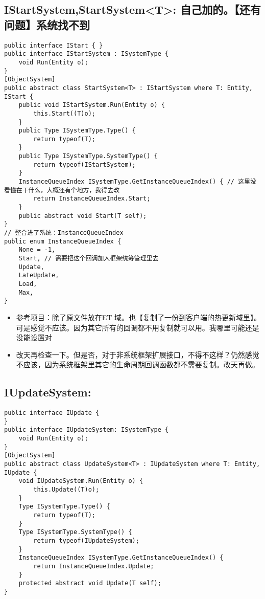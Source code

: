 \documentclass[9pt, b5paper]{article}
\begin{document}
\subsection{IStartSystem,StartSystem<T>: 自己加的。【还有问题】系统找不到}
\label{sec-2-7}
\begin{verbatim}
public interface IStart { }
public interface IStartSystem : ISystemType {
    void Run(Entity o);
}
[ObjectSystem]
public abstract class StartSystem<T> : IStartSystem where T: Entity, IStart {
    public void IStartSystem.Run(Entity o) {
        this.Start((T)o);
    }
    public Type ISystemType.Type() {
        return typeof(T);
    }
    public Type ISystemType.SystemType() {
        return typeof(IStartSystem);
    }
    InstanceQueueIndex ISystemType.GetInstanceQueueIndex() { // 这里没看懂在干什么，大概还有个地方，我得去改
        return InstanceQueueIndex.Start; 
    }
    public abstract void Start(T self);
}
// 整合进了系统：InstanceQueueIndex
public enum InstanceQueueIndex {
    None = -1,
    Start, // 需要把这个回调加入框架统筹管理里去 
    Update,
    LateUpdate,
    Load,
    Max,
}
\end{verbatim}
\begin{itemize}
\item 参考项目：除了原文件放在ET 域。也【复制了一份到客户端的热更新域里】。可是感觉不应该。因为其它所有的回调都不用复制就可以用。我哪里可能还是没能设置对
\item 改天再检查一下。但是否，对于非系统框架扩展接口，不得不这样？仍然感觉不应该，因为系统框架里其它的生命周期回调函数都不需要复制。改天再做。
\end{itemize}
\subsection{IUpdateSystem:}
\label{sec-2-8}
\begin{verbatim}
public interface IUpdate {
}
public interface IUpdateSystem: ISystemType {
    void Run(Entity o);
}
[ObjectSystem]
public abstract class UpdateSystem<T> : IUpdateSystem where T: Entity, IUpdate {
    void IUpdateSystem.Run(Entity o) {
        this.Update((T)o);
    }
    Type ISystemType.Type() {
        return typeof(T);
    }
    Type ISystemType.SystemType() {
        return typeof(IUpdateSystem);
    }
    InstanceQueueIndex ISystemType.GetInstanceQueueIndex() {
        return InstanceQueueIndex.Update;
    }
    protected abstract void Update(T self);
}
\end{verbatim}
\end{document}

